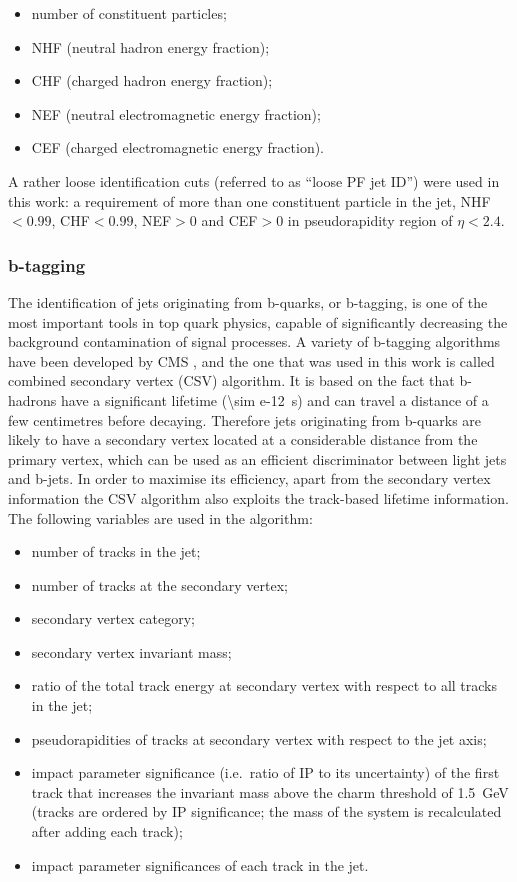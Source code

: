 \begin{itemize}
  \item number of constituent particles;
  \item NHF (neutral hadron energy fraction);
  \item CHF (charged hadron energy fraction);
  \item NEF (neutral electromagnetic energy fraction);
  \item CEF (charged electromagnetic energy fraction).
\end{itemize}

A rather loose identification cuts (referred to as ``loose PF jet ID'') were used in this work: a requirement of more
than one constituent particle in the jet, NHF$<0.99$, CHF$<0.99$, NEF$>0$ and CEF$>0$ in pseudorapidity region of
$\eta<2.4$.

\subsubsection{b-tagging}
\label{sss:b-tagging}
The identification of jets originating from b-quarks, or b-tagging, is one of the  most important tools in top quark
physics, capable of significantly decreasing the background contamination of signal processes. A variety of b-tagging
algorithms have been developed by CMS \cite{b-tagging_CMS}, and the one that was used in this work is called combined
secondary vertex (CSV) algorithm. It is based on the fact that b-hadrons have a significant lifetime (\SI{\sim e-12}{s})
and can travel a distance of a few centimetres before decaying. Therefore jets originating from b-quarks are likely to
have a secondary vertex located at a considerable distance from the primary vertex, which can be used as an efficient
discriminator between light jets and b-jets. In order to maximise its efficiency, apart from the secondary vertex
information the CSV algorithm also exploits the track-based lifetime information. The following variables are used in
the algorithm:
\begin{itemize}
 \item number of tracks in the jet;
 \item number of tracks at the secondary vertex;
 \item secondary vertex category;
 \item secondary vertex invariant mass;
 \item ratio of the total track energy at secondary vertex with respect to all tracks in the jet;
 \item pseudorapidities of tracks at secondary vertex with respect to the jet axis;
 \item impact parameter significance (i.e.\ ratio of IP to its uncertainty) of the first track that increases the
 invariant mass above the charm threshold of \SI{1.5}{\GeV} (tracks are ordered by IP significance; the mass of the
 system is recalculated after adding each track);
 \item impact parameter significances of each track in the jet.
\end{itemize}

